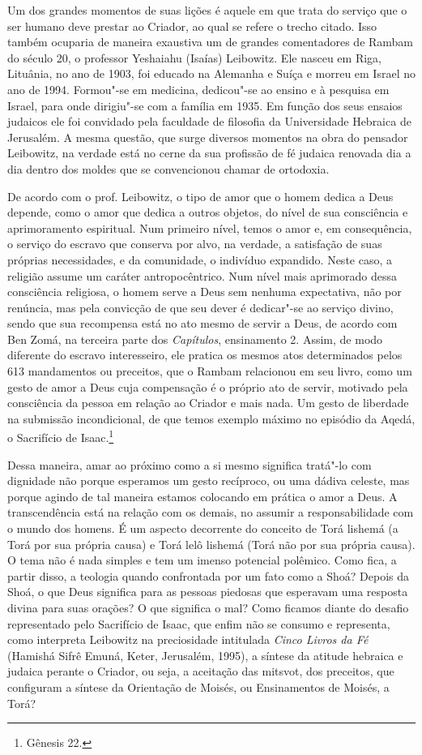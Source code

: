 Um dos grandes momentos de suas lições é aquele em que trata do serviço
que o ser humano deve prestar ao Criador, ao qual se refere o trecho
citado. Isso também ocuparia de maneira exaustiva um de grandes
comentadores de Rambam do século 20, o professor Yeshaiahu (Isaías)
Leibowitz. Ele nasceu em Riga, Lituânia, no ano de 1903, foi educado na
Alemanha e Suíça e morreu em Israel no ano de 1994. Formou"-se em
medicina, dedicou"-se ao ensino e à pesquisa em Israel, para onde
dirigiu"-se com a família em 1935. Em função dos seus ensaios judaicos
ele foi convidado pela faculdade de filosofia da Universidade Hebraica
de Jerusalém. A mesma questão, que surge diversos momentos na obra do
pensador Leibowitz, na verdade está no cerne da sua profissão de fé
judaica renovada dia a dia dentro dos moldes que se convencionou chamar
de ortodoxia.

De acordo com o prof. Leibowitz, o tipo de amor que o homem dedica a
Deus depende, como o amor que dedica a outros objetos, do nível de sua
consciência e aprimoramento espiritual. Num primeiro nível, temos o amor
e, em consequência, o serviço do escravo que conserva por alvo, na
verdade, a satisfação de suas próprias necessidades, e da comunidade, o
indivíduo expandido. Neste caso, a religião assume um caráter
antropocêntrico. Num nível mais aprimorado dessa consciência religiosa,
o homem serve a Deus sem nenhuma expectativa, não por renúncia, mas pela
convicção de que seu dever é dedicar"-se ao serviço divino, sendo que sua
recompensa está no ato mesmo de servir a Deus, de acordo com Ben Zomá,
na terceira parte dos \emph{Capítulos}, ensinamento 2. Assim, de modo
diferente do escravo interesseiro, ele pratica os mesmos atos
determinados pelos 613 mandamentos ou preceitos, que o Rambam relacionou
em seu livro, como um gesto de amor a Deus cuja compensação é o próprio
ato de servir, motivado pela consciência da pessoa em relação ao Criador
e mais nada. Um gesto de liberdade na submissão incondicional, de que
temos exemplo máximo no episódio da Aqedá, o Sacrifício de Isaac.\footnote{Gênesis 22.}

Dessa maneira, amar ao próximo como a si mesmo significa tratá"-lo com
dignidade não porque esperamos um gesto recíproco, ou uma dádiva
celeste, mas porque agindo de tal maneira estamos colocando em prática o
amor a Deus. A transcendência está na relação com os demais, no assumir
a responsabilidade com o mundo dos homens. É um aspecto decorrente do
conceito de Torá lishemá (a Torá por sua própria causa) e Torá lelô
lishemá (Torá não por sua própria causa). O tema não é nada simples e
tem um imenso potencial polêmico. Como fica, a partir disso, a teologia
quando confrontada por um fato como a Shoá? Depois da Shoá, o que Deus
significa para as pessoas piedosas que esperavam uma resposta divina
para suas orações? O que significa o mal? Como ficamos diante do desafio
representado pelo Sacrifício de Isaac, que enfim não se consumo e
representa, como interpreta Leibowitz na preciosidade intitulada
\emph{Cinco Livros da Fé} (Hamishá Sifrê Emuná, Keter, Jerusalém, 1995),
a síntese da atitude hebraica e judaica perante o Criador, ou seja, a
aceitação das mitsvot, dos preceitos, que configuram a síntese da
Orientação de Moisés, ou Ensinamentos de Moisés, a Torá?

